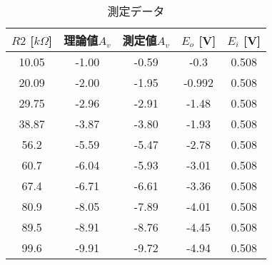 \documentclass[a4paper,11pt,xelatex,ja=standard]{bxjsarticle}
\begin{document}
        \begin{table}[htbp]
            \centering
            \caption{測定データ}
            \begin{tabular}{|c|c|c|c|c|}
            \hline
            $R2$ [$k\Omega$] & 理論値$A_v$ & 測定値$A_v$ & $E_o$ [V] & $E_i$ [V] \\
            \hline
            10.05 & -1.00 & -0.59 & -0.3 & 0.508 \\
            20.09 & -2.00 & -1.95 & -0.992 & 0.508 \\
            29.75 & -2.96 & -2.91 & -1.48 & 0.508 \\
            38.87 & -3.87 & -3.80 & -1.93 & 0.508 \\
            56.2  & -5.59 & -5.47 & -2.78 & 0.508 \\
            60.7  & -6.04 & -5.93 & -3.01 & 0.508 \\
            67.4  & -6.71 & -6.61 & -3.36 & 0.508 \\
            80.9  & -8.05 & -7.89 & -4.01 & 0.508 \\
            89.5  & -8.91 & -8.76 & -4.45 & 0.508 \\
            99.6  & -9.91 & -9.72 & -4.94 & 0.508 \\
            \hline
            \end{tabular}
            \label{tab:mytable}
        \end{table}
\end{document}
